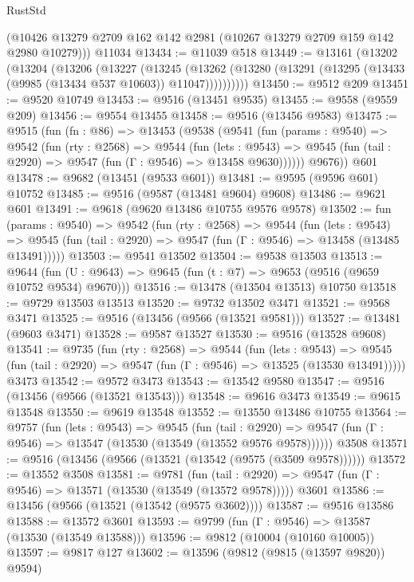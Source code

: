 \begin{lexlean}{RustStd}
\begin{coremodule}
      (@10426 @13279 @2709 @162 @142 @2981 (@10267 @13279 @2709 @159 @142 @2980 @10279)))
    @11034
@13434 := @11039 @518
@13449 := @13161
    (@13202
      (@13204
        (@13206
          (@13227
            (@13245
              (@13262 (@13280 (@13291 (@13295 (@13433 (@9985 (@13434 @537 @10603)) @11047))))))))))
@13450 := @9512 @209
@13451 := @9520 @10749
@13453 := @9516 (@13451 @9535)
@13455 := @9558 (@9559 @209)
@13456 := @9554 @13455
@13458 := @9516 (@13456 @9583)
@13475 := @9515
    (fun (fn : @86) =>
    @13453
      (@9538
        (@9541
          (fun (params : @9540) =>
          @9542
            (fun (rty : @2568) =>
            @9544
              (fun (lets : @9543) =>
              @9545 (fun (tail : @2920) => @9547 (fun (Γ : @9546) => @13458 @9630))))))
        @9676))
    @601
@13478 := @9682 (@13451 (@9533 @601))
@13481 := @9595 (@9596 @601) @10752
@13485 := @9516 (@9587 (@13481 @9604) @9608)
@13486 := @9621 @601
@13491 := @9618 (@9620 @13486 @10755 @9576 @9578)
@13502 := fun (params : @9540) =>
  @9542
    (fun (rty : @2568) =>
    @9544
      (fun (lets : @9543) =>
      @9545 (fun (tail : @2920) => @9547 (fun (Γ : @9546) => @13458 (@13485 @13491)))))
@13503 := @9541 @13502
@13504 := @9538 @13503
@13513 := @9644
    (fun (U : @9643) => @9645 (fun (t : @7) => @9653 (@9516 (@9659 @10752 @9534) @9670)))
@13516 := @13478 (@13504 @13513) @10750
@13518 := @9729 @13503 @13513
@13520 := @9732 @13502 @3471
@13521 := @9568 @3471
@13525 := @9516 (@13456 (@9566 (@13521 @9581)))
@13527 := @13481 (@9603 @3471)
@13528 := @9587 @13527
@13530 := @9516 (@13528 @9608)
@13541 := @9735
    (fun (rty : @2568) =>
    @9544
      (fun (lets : @9543) =>
      @9545 (fun (tail : @2920) => @9547 (fun (Γ : @9546) => @13525 (@13530 @13491)))))
    @3473
@13542 := @9572 @3473
@13543 := @13542 @9580
@13547 := @9516 (@13456 (@9566 (@13521 @13543)))
@13548 := @9616 @3473
@13549 := @9615 @13548
@13550 := @9619 @13548
@13552 := @13550 @13486 @10755
@13564 := @9757
    (fun (lets : @9543) =>
    @9545
      (fun (tail : @2920) =>
      @9547 (fun (Γ : @9546) => @13547 (@13530 (@13549 (@13552 @9576 @9578))))))
    @3508
@13571 := @9516 (@13456 (@9566 (@13521 (@13542 (@9575 (@3509 @9578))))))
@13572 := @13552 @3508
@13581 := @9781
    (fun (tail : @2920) => @9547 (fun (Γ : @9546) => @13571 (@13530 (@13549 (@13572 @9578)))))
    @3601
@13586 := @13456 (@9566 (@13521 (@13542 (@9575 @3602))))
@13587 := @9516 @13586
@13588 := @13572 @3601
@13593 := @9799 (fun (Γ : @9546) => @13587 (@13530 (@13549 @13588)))
@13596 := @9812 (@10004 (@10160 @10005))
@13597 := @9817 @127
@13602 := @13596 (@9812 (@9815 (@13597 @9820)) @9594)

\end{coremodule}
\end{lexlean}
